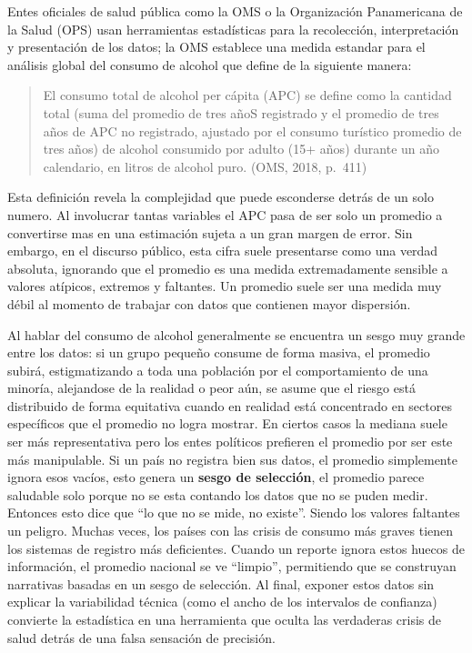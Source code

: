 \documentclass[oneside,11pt]{Latex/Classes/PhDthesisPSnPDF}
\begin{document}
Entes oficiales de salud pública como la OMS o la Organización
Panamericana de la Salud (OPS) usan herramientas estadísticas para la
recolección, interpretación y presentación de los datos; la OMS
establece una medida estandar para el análisis global del consumo de
alcohol que define de la siguiente manera:

\begin{quote}
El consumo total de alcohol per cápita (APC) se define como la cantidad
total (suma del promedio de tres añoS registrado y el promedio de tres
años de APC no registrado, ajustado por el consumo turístico promedio de
tres años) de alcohol consumido por adulto (15+ años) durante un año
calendario, en litros de alcohol puro. (OMS, 2018, p.~411)
\end{quote}

Esta definición revela la complejidad que puede esconderse detrás de un
solo numero. Al involucrar tantas variables el APC pasa de ser solo un
promedio a convertirse mas en una estimación sujeta a un gran margen de
error. Sin embargo, en el discurso público, esta cifra suele presentarse
como una verdad absoluta, ignorando que el promedio es una medida
extremadamente sensible a valores atípicos, extremos y faltantes. Un
promedio suele ser una medida muy débil al momento de trabajar con datos
que contienen mayor dispersión.

Al hablar del consumo de alcohol generalmente se encuentra un sesgo muy
grande entre los datos: si un grupo pequeño consume de forma masiva, el
promedio subirá, estigmatizando a toda una población por el
comportamiento de una minoría, alejandose de la realidad o peor aún, se
asume que el riesgo está distribuido de forma equitativa cuando en
realidad está concentrado en sectores específicos que el promedio no
logra mostrar. En ciertos casos la mediana suele ser más representativa
pero los entes políticos prefieren el promedio por ser este más
manipulable. Si un país no registra bien sus datos, el promedio
simplemente ignora esos vacíos, esto genera un \textbf{sesgo de
selección}, el promedio parece saludable solo porque no se esta contando
los datos que no se puden medir. Entonces esto dice que ``lo que no se
mide, no existe''. Siendo los valores faltantes un peligro. Muchas
veces, los países con las crisis de consumo más graves tienen los
sistemas de registro más deficientes. Cuando un reporte ignora estos
huecos de información, el promedio nacional se ve ``limpio'',
permitiendo que se construyan narrativas basadas en un sesgo de
selección. Al final, exponer estos datos sin explicar la variabilidad
técnica (como el ancho de los intervalos de confianza) convierte la
estadística en una herramienta que oculta las verdaderas crisis de salud
detrás de una falsa sensación de precisión.
\end{document}

